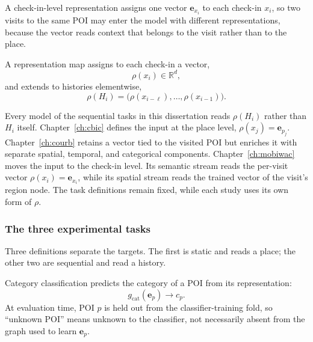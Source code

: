 \begin{definition}\label{def:fund:checkinlevel}
    A check-in-level representation assigns one vector $\mathbf{e}_{x_i}$ to each check-in
    $x_i$, so two visits to the same POI may enter the model with different
    representations, because the vector reads context that belongs to the visit rather
    than to the place.
\end{definition}

\begin{definition}\label{def:fund:repmap}
    A representation map assigns to each check-in a vector,
    \begin{equation}
        \rho(x_i)\in\mathbb{R}^{d},
    \end{equation}
    and extends to histories elementwise,
    \begin{equation}
        \rho(H_i)=\bigl(\rho(x_{i-\ell}),\ldots,\rho(x_{i-1})\bigr).
    \end{equation}
\end{definition}

Every model of the sequential tasks in this dissertation reads $\rho(H_i)$ rather than
$H_i$ itself. Chapter~\ref{ch:cbic} defines the input at the place level,
$\rho(x_j)=\mathbf{e}_{p_j}$. Chapter~\ref{ch:courb} retains a vector tied to the visited
POI but enriches it with separate spatial, temporal, and categorical components.
Chapter~\ref{ch:mobiwac} moves the input to the check-in level. Its semantic stream reads
the per-visit vector $\rho(x_i)=\mathbf{e}_{x_i}$, while its spatial stream reads the
trained vector of the visit's region node. The task definitions remain fixed, while
each study uses its own form of $\rho$.

\subsubsection{The three experimental tasks}

Three definitions separate the targets. The first is static and reads a place; the
other two are sequential and read a history.

\begin{definition}\label{def:fund:catclf}
    Category classification predicts the category of a POI from its representation:
    \begin{equation}
        g_{\mathrm{cat}}(\mathbf{e}_p)\longrightarrow c_p.
    \end{equation}
    At evaluation time, POI $p$ is held out from the classifier-training fold, so
    ``unknown POI'' means unknown to the classifier, not necessarily absent from the graph
    used to learn $\mathbf{e}_p$.
\end{definition}

